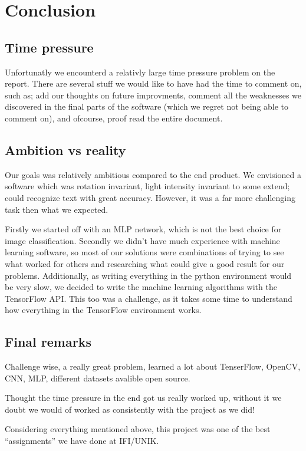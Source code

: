\documentclass[Report.tex]{subfiles}
\begin{document}
\chapter{Conclusion}
\label{chap:Conclusion}
\section{Time pressure}
Unfortunatly we encounterd a relativly large time pressure problem on the report. There are several stuff we would like to have had the time to comment on, such as; add our thoughts on future improvments, comment all the weaknesses we discovered in the final parts of the software (which we regret not being able to comment on), and ofcourse, proof read the entire document.

\section{Ambition vs reality}
\begin{flushleft}
Our goals was relatively ambitious compared to the end product. We envisioned
a software which was rotation invariant, light intensity invariant to some
extend; could recognize text with great accuracy. However, it was a far more
challenging task then what we expected. \par
Firstly we started off with an MLP network, which is not the best choice for
image classification. Secondly we didn't have much experience with
machine learning software, so most of our solutions were combinations of
trying to see what worked for others and researching what could give a good result for
our problems. Additionally, as writing everything in the python environment
would be very slow, we decided to write the machine learning algorithms with the
TensorFlow API. This too was a challenge, as it takes some time to understand
how everything in the TensorFlow environment works.
\end{flushleft}


\section{Final remarks}
Challenge wise, a really great problem, learned a lot about TenserFlow, OpenCV,
CNN, MLP, different datasets avalible open source. \par

Thought the time pressure in the end got us really worked up, without it we doubt
we would of worked as consistently with the project as we did! \par

Considering everything mentioned above, this project was one of the best ``assignments'' we have done at IFI/UNIK.
\end{document}
